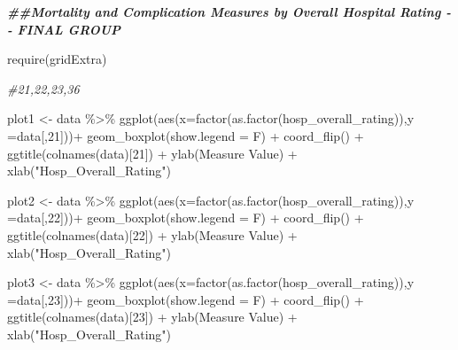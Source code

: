 \documentclass[
]{article}
\newenvironment{Shaded}{\begin{snugshade}}{\end{snugshade}}
\newcommand{\AttributeTok}[1]{\textcolor[rgb]{0.77,0.63,0.00}{#1}}
\newcommand{\CommentTok}[1]{\textcolor[rgb]{0.56,0.35,0.01}{\textit{#1}}}
\newcommand{\DecValTok}[1]{\textcolor[rgb]{0.00,0.00,0.81}{#1}}
\newcommand{\DocumentationTok}[1]{\textcolor[rgb]{0.56,0.35,0.01}{\textbf{\textit{#1}}}}
\newcommand{\FunctionTok}[1]{\textcolor[rgb]{0.00,0.00,0.00}{#1}}
\newcommand{\NormalTok}[1]{#1}
\newcommand{\OtherTok}[1]{\textcolor[rgb]{0.56,0.35,0.01}{#1}}
\newcommand{\SpecialCharTok}[1]{\textcolor[rgb]{0.00,0.00,0.00}{#1}}
\newcommand{\StringTok}[1]{\textcolor[rgb]{0.31,0.60,0.02}{#1}}
\begin{document}
\begin{Shaded}
\begin{Highlighting}[]
\DocumentationTok{\#\#Mortality and Complication Measures by Overall Hospital Rating {-}{-} FINAL GROUP}

\FunctionTok{require}\NormalTok{(gridExtra)}

\CommentTok{\#21,22,23,36}

\NormalTok{plot1 }\OtherTok{\textless{}{-}}\NormalTok{ data }\SpecialCharTok{\%\textgreater{}\%} \FunctionTok{ggplot}\NormalTok{(}\FunctionTok{aes}\NormalTok{(}\AttributeTok{x=}\FunctionTok{factor}\NormalTok{(}\FunctionTok{as.factor}\NormalTok{(hosp\_overall\_rating)),}\AttributeTok{y =}\NormalTok{data[,}\DecValTok{21}\NormalTok{]))}\SpecialCharTok{+}
  \FunctionTok{geom\_boxplot}\NormalTok{(}\AttributeTok{show.legend =}\NormalTok{ F) }\SpecialCharTok{+}
  \FunctionTok{coord\_flip}\NormalTok{() }\SpecialCharTok{+}
  \FunctionTok{ggtitle}\NormalTok{(}\FunctionTok{colnames}\NormalTok{(data)[}\DecValTok{21}\NormalTok{]) }\SpecialCharTok{+} 
  \FunctionTok{ylab}\NormalTok{(}\StringTok{\textquotesingle{}Measure Value\textquotesingle{}}\NormalTok{) }\SpecialCharTok{+} \FunctionTok{xlab}\NormalTok{(}\StringTok{"Hosp\_Overall\_Rating"}\NormalTok{)}


\NormalTok{plot2 }\OtherTok{\textless{}{-}}\NormalTok{ data }\SpecialCharTok{\%\textgreater{}\%} \FunctionTok{ggplot}\NormalTok{(}\FunctionTok{aes}\NormalTok{(}\AttributeTok{x=}\FunctionTok{factor}\NormalTok{(}\FunctionTok{as.factor}\NormalTok{(hosp\_overall\_rating)),}\AttributeTok{y =}\NormalTok{data[,}\DecValTok{22}\NormalTok{]))}\SpecialCharTok{+}
  \FunctionTok{geom\_boxplot}\NormalTok{(}\AttributeTok{show.legend =}\NormalTok{ F) }\SpecialCharTok{+}
  \FunctionTok{coord\_flip}\NormalTok{() }\SpecialCharTok{+}
  \FunctionTok{ggtitle}\NormalTok{(}\FunctionTok{colnames}\NormalTok{(data)[}\DecValTok{22}\NormalTok{]) }\SpecialCharTok{+} 
  \FunctionTok{ylab}\NormalTok{(}\StringTok{\textquotesingle{}Measure Value\textquotesingle{}}\NormalTok{) }\SpecialCharTok{+} \FunctionTok{xlab}\NormalTok{(}\StringTok{"Hosp\_Overall\_Rating"}\NormalTok{)}

\NormalTok{plot3 }\OtherTok{\textless{}{-}}\NormalTok{ data }\SpecialCharTok{\%\textgreater{}\%} \FunctionTok{ggplot}\NormalTok{(}\FunctionTok{aes}\NormalTok{(}\AttributeTok{x=}\FunctionTok{factor}\NormalTok{(}\FunctionTok{as.factor}\NormalTok{(hosp\_overall\_rating)),}\AttributeTok{y =}\NormalTok{data[,}\DecValTok{23}\NormalTok{]))}\SpecialCharTok{+}
  \FunctionTok{geom\_boxplot}\NormalTok{(}\AttributeTok{show.legend =}\NormalTok{ F) }\SpecialCharTok{+}
  \FunctionTok{coord\_flip}\NormalTok{() }\SpecialCharTok{+}
  \FunctionTok{ggtitle}\NormalTok{(}\FunctionTok{colnames}\NormalTok{(data)[}\DecValTok{23}\NormalTok{]) }\SpecialCharTok{+} 
  \FunctionTok{ylab}\NormalTok{(}\StringTok{\textquotesingle{}Measure Value\textquotesingle{}}\NormalTok{) }\SpecialCharTok{+} \FunctionTok{xlab}\NormalTok{(}\StringTok{"Hosp\_Overall\_Rating"}\NormalTok{)}



\end{Highlighting}
\end{Shaded}
\end{document}
